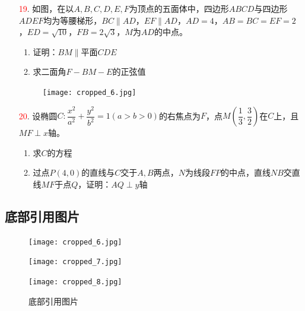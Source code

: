 \documentclass[12pt]{ctexart}
\begin{document}
\begin{enumerate}[resume*]
    \item[\textcolor{red}{19}.] 如图，在以\( A,B,C,D,E,F \)为顶点的五面体中，四边形\( ABCD \)与四边形\( ADEF \)均为等腰梯形，\( BC \parallel AD \)，\( EF \parallel AD \)，\( AD = 4 \)，\( AB = BC = EF = 2 \)，\( ED = \sqrt{10} \)，\( FB = 2\sqrt{3} \)，\( M \)为\( AD \)的中点。
    \begin{enumerate}[label=(\arabic*)]
        \item 证明：\( BM \parallel \)平面\( CDE \)
        \item 求二面角\( F-BM-E \)的正弦值
    \end{enumerate}
    \begin{figure}[H]
        \centering
        \texttt{[image: cropped\_6.jpg]}
    \end{figure}
    
    \item[\textcolor{red}{20}.] 设椭圆\( C:\dfrac{x^2}{a^2} + \dfrac{y^2}{b^2} = 1(a > b > 0) \)的右焦点为\( F \)，点\( M\left(\dfrac{1}{3}, \dfrac{3}{2}\right) \)在\( C \)上，且\( MF \perp x \)轴。
    \begin{enumerate}[label=(\arabic*)]
        \item 求\( C \)的方程
        \item 过点\( P(4,0) \)的直线与\( C \)交于\( A,B \)两点，\( N \)为线段\( FP \)的中点，直线\( NB \)交直线\( MF \)于点\( Q \)，证明：\( AQ \perp y \)轴
    \end{enumerate}
\end{enumerate}

\subsection*{底部引用图片}
\begin{figure}[H]
    \centering
    \begin{minipage}{0.3\textwidth}
        \texttt{[image: cropped\_6.jpg]}
    \end{minipage}
    \hfill
    \begin{minipage}{0.3\textwidth}
        \texttt{[image: cropped\_7.jpg]}
    \end{minipage}
    \hfill
    \begin{minipage}{0.3\textwidth}
        \texttt{[image: cropped\_8.jpg]}
    \end{minipage}
    \caption{底部引用图片}
\end{figure}
\end{document}
